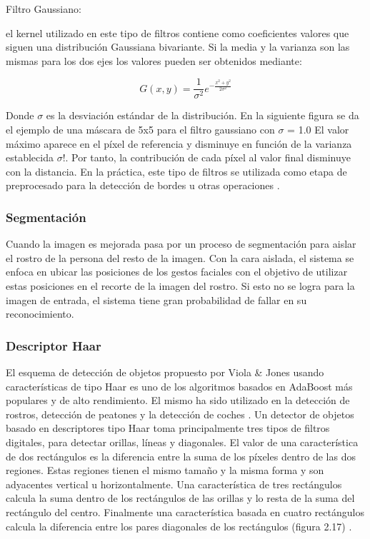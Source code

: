 \begin{enumerate}
\begin{itemize}
\begin{enumerate}
{\bf\item[B.3. ] Filtro Gaussiano:}
el kernel utilizado en este tipo de filtros contiene como coeficientes valores que siguen una distribución Gaussiana bivariante. Si la media y la varianza son las mismas para los dos ejes los valores pueden ser obtenidos mediante:

\begin{equation}
G(x,y)=\frac{1}{\sigma^2}{e^{-\frac{x^2+y^2}{2\sigma^2}}}
\end{equation}

Donde $\sigma$ es la desviación estándar de la distribución. En la siguiente figura se da el ejemplo de una máscara de 5x5 para el filtro gaussiano con $\sigma$ = 1.0 
\vskip 0.1cm
El valor máximo aparece en el píxel de referencia y disminuye en función de la varianza establecida $\sigma$!. Por tanto, la contribución de cada píxel al valor final disminuye con la distancia. En la práctica, este tipo de filtros se utilizada como etapa de preprocesado para la detección de bordes u otras operaciones \citep{Enrique}.

\end{enumerate}

\end{itemize}
\end{enumerate}

\subsubsection{Segmentación}
Cuando la imagen es mejorada pasa por un proceso de segmentación para aislar el rostro de la persona del resto de la imagen. Con la cara aislada, el sistema se enfoca en ubicar las posiciones de los gestos faciales con el objetivo de utilizar estas posiciones en el recorte de la imagen del rostro. Si esto no se logra para la imagen de entrada, el sistema tiene gran probabilidad de fallar en su reconocimiento.

\subsubsection{Descriptor Haar}
El esquema de detección de objetos propuesto por Viola \& Jones usando características de tipo Haar es uno de los algoritmos basados en AdaBoost más populares y de alto rendimiento. El mismo ha sido utilizado en la detección de rostros, detección de peatones y la detección de coches \citep{Fernando}.
\vskip 0.1cm
Un detector de objetos basado en descriptores tipo Haar toma principalmente tres tipos de filtros digitales, para detectar orillas, líneas y diagonales. El valor de una característica de dos rectángulos es la diferencia entre la suma de los píxeles dentro de las dos regiones. Estas regiones tienen el mismo tamaño y la misma forma y son adyacentes vertical u horizontalmente. Una característica de tres rectángulos calcula la suma dentro de los rectángulos de las orillas y lo resta de la suma del rectángulo del centro. Finalmente una característica basada en cuatro rectángulos calcula la diferencia entre los pares diagonales de los rectángulos (figura 2.17) \citep{Lopez}.

